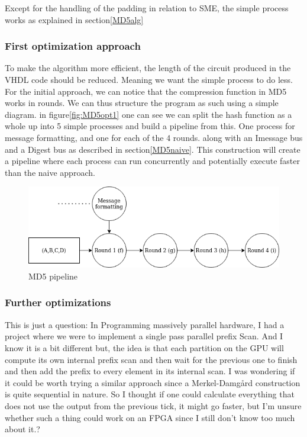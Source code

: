 \documentclass[a4paper]{article}
\begin{document}
Except for the handling of the padding in relation to SME, the simple process works as explained in section\ref{MD5alg}

\subsubsection{First optimization approach}
\label{sec:orgbee67c1}
To make the algorithm more efficient, the length of the circuit produced in the VHDL code should be reduced. Meaning we want the simple process to do less. For the initial approach, we can notice that the compression function in MD5 works in rounds. We can thus structure the program as such using a simple diagram. in figure\ref{fig:MD5opt1} one can see we can split the hash function as a whole up into 5 simple processes and build a pipeline from this. One process for message formatting, and one for each of the 4 rounds. along with an Imessage bus and a Digest bus as described in section\ref{MD5naive}. This construction will create a pipeline where each process can run concurrently and potentially execute faster than the naive approach.
\begin{figure}[htbp]
\centering
\includegraphics[width=.9\linewidth]{./MD5.png}
\caption{\label{fig:org9fac5aa}
MD5 pipeline}
\end{figure}

\subsubsection{Further optimizations}
\label{sec:orgdacf3ae}
This is just a question:
In Programming massively parallel hardware, I had a project where we were to implement a single pass parallel prefix Scan. And I know it is a bit different but, the idea is that each partition on the GPU will compute its own internal prefix scan and then wait for the previous one to finish and then add the prefix to every element in its internal scan. I was wondering if it could be worth trying a similar approach since a Merkel-Damgård construction is quite sequential in nature. So I thought if one could calculate everything that does not use the output from the previous tick, it might go faster, but I'm unsure whether such a thing could work on an FPGA since I still don't know too much about it.?
\end{document}
